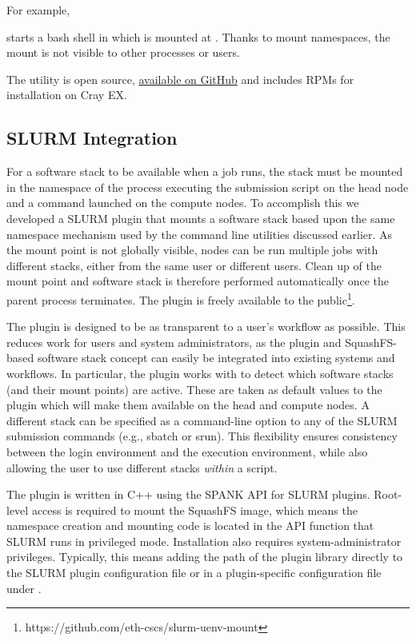 For example,



starts a bash shell in which  is mounted at .
Thanks to mount namespaces, the mount is not visible to other processes or users.

The utility is open source, \href{https://github.com/eth-cscs/squashfs-mount}{available on GitHub} and includes RPMs for installation on Cray EX.

\subsection{SLURM Integration}


For a software stack to be available when a job runs, the stack must be mounted in the namespace of the process executing the submission script on the head node and a command launched on the compute nodes.
To accomplish this we developed a SLURM plugin that mounts a software stack based upon the same namespace mechanism used by the command line utilities discussed earlier.
As the mount point is not globally visible, nodes can be run multiple jobs with different stacks, either from the same user or different users.
Clean up of the mount point and software stack is therefore performed automatically once the parent process terminates.
The plugin is freely available to the public\footnote{https://github.com/eth-cscs/slurm-uenv-mount}.

The plugin is designed to be as transparent to a user's workflow as possible.
This reduces work for users and system administrators, as the plugin and SquashFS-based software stack concept can easily be integrated into existing systems and workflows.
In particular, the plugin works with  to detect which software stacks (and their mount points) are active.
These are taken as default values to the plugin which will make them available on the head and compute nodes.
A different stack can be specified as a command-line option to any of the SLURM submission commands (e.g., sbatch or srun).
This flexibility ensures consistency between the login environment and the execution environment, while also allowing the user to use different stacks \emph{within} a script.

The plugin is written in C++ using the SPANK API for SLURM plugins.
Root-level access is required to mount the SquashFS image, which means the namespace creation and mounting code is located in the API function that SLURM runs in privileged mode.
Installation also requires system-administrator privileges.
Typically, this means adding the path of the plugin library directly to the SLURM plugin configuration file  or in a plugin-specific configuration file under .

